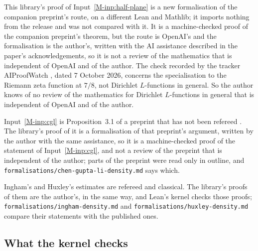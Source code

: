 \documentclass[11pt]{article}
\newcommand{\file}[1]{\nolinkurl{#1}}
\numberwithin{equation}{section}
\begin{document}
This library's proof of Input~\ref{M-inp:half-plane} is a new
formalisation of the companion preprint's route, on a different Lean and Mathlib; it imports nothing from the release
and was not compared with it. It is a machine-checked proof of the companion preprint's theorem, but the route is
OpenAI's and the formalisation is the author's, written with the AI assistance described in the paper's
acknowledgements, so
it is not a review of the mathematics that is independent of OpenAI and of the author. The check recorded by the tracker
AIProofWatch \cite{aiproofwatch}, dated 7 October 2026, concerns the
specialisation to the Riemann zeta function at $7/8$, not Dirichlet $L$-functions in general. So the author knows of no
review of the mathematics for Dirichlet $L$-functions in general that is independent of OpenAI and of the author.

Input~\ref{M-inp:cgl} is Proposition~3.1 of a preprint that has not been refereed \cite{cgl}. The library's proof of it
is a formalisation of that preprint's argument, written by the author with the same assistance, so it is a
machine-checked proof of the statement of Input~\ref{M-inp:cgl}, and not a review of the preprint that is independent
of the author; parts of the preprint were read only in outline, and \file{formalisations/chen-gupta-li-density.md}
says which.

Ingham's and Huxley's estimates are refereed and classical. The library's proofs of them are the author's, in the same
way, and Lean's kernel checks those proofs; \file{formalisations/ingham-density.md} and
\file{formalisations/huxley-density.md} compare their statements with the published ones.

\subsection*{What the kernel checks}
\end{document}
